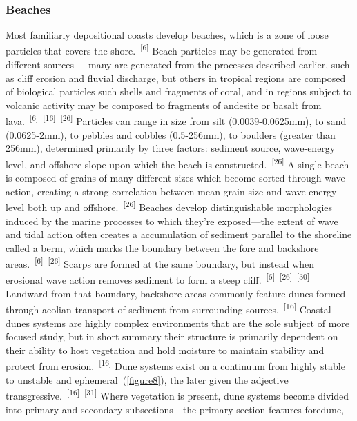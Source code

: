 \documentclass{article}
\begin{document}
\subsubsection{Beaches}


\par{Most familiarly depositional coasts develop beaches, which is a zone of loose particles that covers the shore.~\textsuperscript{[6]} Beach particles may be generated from different sources—--many are generated from the processes described earlier, such as cliff erosion and fluvial discharge, but others in tropical regions are composed of biological particles such shells and fragments of coral, and in regions subject to volcanic activity may be composed to fragments of andesite or basalt from lava.~\textsuperscript{[6]}~\textsuperscript{[16]}~\textsuperscript{[26]} Particles can range in size from silt (0.0039-0.0625mm), to sand (0.0625-2mm), to pebbles and cobbles (0.5-256mm), to boulders (greater than 256mm), determined primarily by three factors: sediment source, wave-energy level, and offshore slope upon which the beach is constructed.~\textsuperscript{[26]} A single beach is composed of grains of many different sizes which become sorted through wave action, creating a strong correlation between mean grain size and wave energy level both up and offshore.~\textsuperscript{[26]} Beaches develop distinguishable morphologies induced by the marine processes to which they're exposed---the extent of wave and tidal action often creates a accumulation of sediment parallel to the shoreline called a berm, which marks the boundary between the fore and backshore areas.~\textsuperscript{[6]}~\textsuperscript{[26]} Scarps are formed at the same boundary, but instead when erosional wave action removes sediment to form a steep cliff.~\textsuperscript{[6]}~\textsuperscript{[26]}~\textsuperscript{[30]} Landward from that boundary, backshore areas commonly feature dunes formed through aeolian transport of sediment from surrounding sources.~\textsuperscript{[16]} Coastal dunes systems are highly complex environments that are the sole subject of more focused study, but in short summary their structure is primarily dependent on their ability to host vegetation and hold moisture to maintain stability and protect from erosion.~\textsuperscript{[16]} Dune systems exist on a continuum from highly stable to unstable and ephemeral~(\cref{figure8}), the later given the adjective transgressive.~\textsuperscript{[16]}~\textsuperscript{[31]} Where vegetation is present, dune systems become divided into primary and secondary subsections---the primary section features foredune, }
\end{document}
